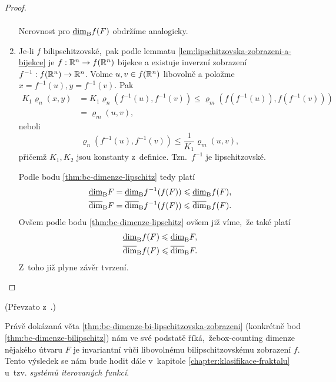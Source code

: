 \begin{proof}
\begin{enumerate}[label=\textit{(\roman*)}]
\begin{align*}
        \end{align*}
        Nerovnost pro $\underline{\dim}_\textup{B}{f(F)}$ obdržíme analogicky.
        \item Je-li $f$ bilipschitzovské,~pak podle lemmatu \ref{lem:lipschitzovska-zobrazeni-a-bijekce} je $f:\mathbb{R}^n \rightarrow f(\mathbb{R}^n)$ bijekce a existuje inverzní zobrazení $f^{-1}:f(\mathbb{R}^n) \rightarrow \mathbb{R}^n$. Volme $u,v\in f(\mathbb{R}^n)$ libovolně a položme $x=f^{-1}(u),y=f^{-1}(v)$. Pak
        \begin{align*}
            K_1\varrho_n(x,y)&=K_1\varrho_n(f^{-1}(u),f^{-1}(v))\leqslant\varrho_m(f(f^{-1}(u)),f(f^{-1}(v)))\\
            &=\varrho_m(u,v),
        \end{align*}
        neboli
        \[\varrho_n(f^{-1}(u),f^{-1}(v))\leqslant\dfrac{1}{K_1}\varrho_m(u,v),\]
        přičemž $K_1,K_2$ jsou konstanty z~definice. Tzn.~$f^{-1}$ je lipschitzovské.

        Podle bodu \ref{thm:bc-dimenze-lipschitz} tedy platí
        \begin{align*}
            \underline{\dim}_\textup{B}{F}&=\underline{\dim}_\textup{B}{f^{-1}(f(F))}\leqslant\underline{\dim}_\textup{B}{f(F)},\\
            \overline{\dim}_\textup{B}{F}&=\overline{\dim}_\textup{B}{f^{-1}(f(F))}\leqslant\overline{\dim}_\textup{B}{f(F)}.
        \end{align*}
        Ovšem podle bodu \ref{thm:bc-dimenze-lipschitz} ovšem již víme,~že také platí
        \begin{align*}
            \underline{\dim}_\textup{B}{f(F)}&\leqslant\underline{\dim}_\textup{B}{F},\\
            \overline{\dim}_\textup{B}{f(F)}&\leqslant\overline{\dim}_\textup{B}{F}.
        \end{align*}
        Z~toho již plyne závěr tvrzení.
    \end{enumerate}
\end{proof}
(Převzato z~\citep[str. 36]{Falconer2014}.)

Právě dokázaná věta \ref{thm:bc-dimenze-bi-lipschitzovska-zobrazeni} (konkrétně bod \ref{thm:bc-dimenze-bilipschitz}) nám ve své podstatě říká,~že\linebreak{}box-counting dimenze nějakého útvaru $F$ je invariantní vůči libovolnému bilipschitzovskému zobrazení $f$. Tento výsledek se nám bude hodit dále v~kapitole \ref{chapter:klasifikace-fraktalu} u~tzv. \emph{systémů iterovaných funkcí}.